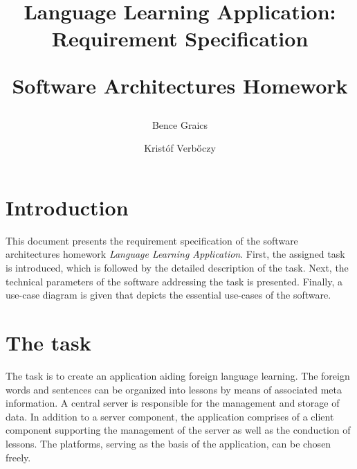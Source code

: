 \documentclass[a4paper]{article}
\begin{document}
	
	\newcommand{\specialcell}[2][c]{%
		\begin{tabular}[#1]{@{}c@{}}#2\end{tabular}}
	
	\newenvironment*{mytable}[3]{
		\begin{table}[htbp]	
			\caption{#1}          
			\label{tab:#2}            
			\center%
			\begin{tabular}{#3}
			}
			{
			\end{tabular}
		\end{table}
	}
	
	\pagestyle{plain}
	
	
	
	\nonfrenchspacing
	\setlength{\parindent}{0em}
	\setlength{\parskip}{0.45em}
	
	\title{Language Learning Application: \\ Requirement Specification \\ \begin{large}Software Architectures Homework \end{large}}
	\author{Bence Graics \and Kristóf Verbőczy}	
	\date{}
	\maketitle
	\section*{Introduction}
	This document presents the requirement specification of the software architectures homework \textsl{Language Learning Application}. First, the assigned task is introduced, which is followed by the detailed description of the task. Next, the technical parameters of the software addressing the task is presented. Finally, a use-case diagram is given that depicts the essential use-cases of the software.
	\section{The task}
	The task is to create an application aiding foreign language learning. The foreign words and sentences can be organized into lessons by means of associated meta information. A central server is responsible for the management and storage of data. In addition to a server component, the application comprises of a client component supporting the management of the server as well as the conduction of lessons. The platforms, serving as the basis of the application, can be chosen freely.
	
\end{document}
